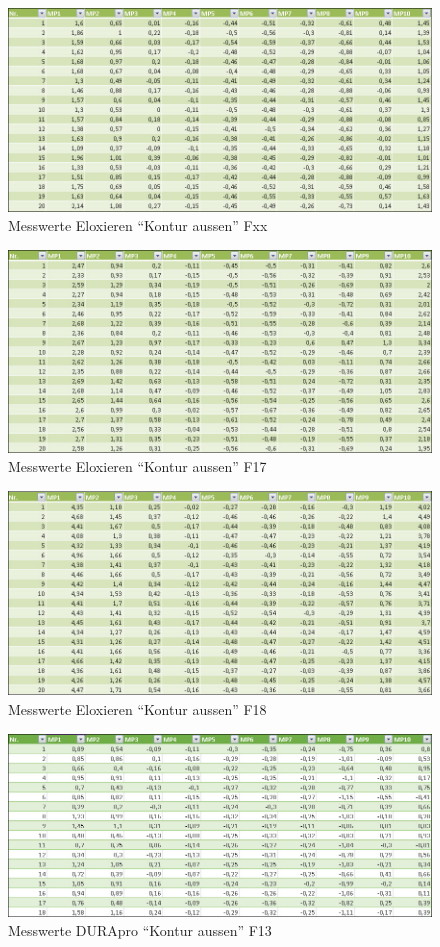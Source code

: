 \documentclass[12pt,a4paper,parskip]{scrartcl}
\begin{document}
\begin{figure}[hbtp]
\centering
\includegraphics[width=1\textwidth]{Fxxelox.jpg}
\caption{Messwerte Eloxieren "`Kontur aussen"' Fxx}
\end{figure}
\begin{figure}[hbtp]
\centering
\includegraphics[width=1\textwidth]{F17elox.jpg}
\caption{Messwerte Eloxieren "`Kontur aussen"' F17}
\end{figure}
\begin{figure}[hbtp]
\centering
\includegraphics[width=1\textwidth]{F18elox.jpg}
\caption{Messwerte Eloxieren "`Kontur aussen"' F18}
\end{figure}
\begin{figure}[hbtp]
\centering
\includegraphics[width=1\textwidth]{F13durapro.jpg}
\caption{Messwerte DURApro "`Kontur aussen"' F13}
\end{figure}
\end{document}
